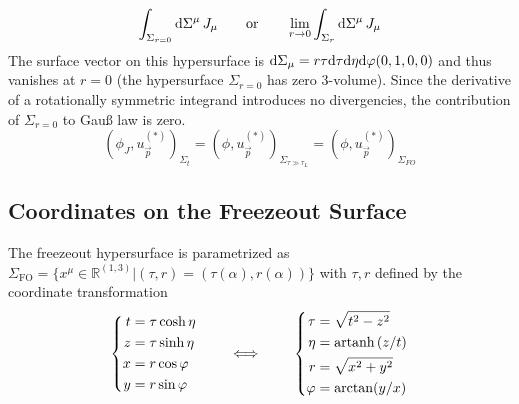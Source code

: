 \begin{equation*}
    \int_{\Sigma_{r=0}}\text{d}\Sigma^\mu\,J_\mu\qquad\text{or}\qquad\lim_{r\to 0}\int_{\Sigma_{r}}\text{d}\Sigma^\mu\,J_\mu
\end{equation*}
The surface vector on this hypersurface is $\text{d}\Sigma_\mu=r\tau\text{d}\tau\text{d}\eta\text{d}\varphi(0,1,0,0)$ and thus vanishes at $r=0$ (the hypersurface $\Sigma_{r=0}$ has zero $3$-volume). Since the derivative of a rotationally symmetric integrand introduces no divergencies, the contribution of $\Sigma_{r=0}$ to Gauß law is zero.
\begin{equation}
    (\phi_J,u_{\vec{p}}^{(*)})_{\Sigma_t}=(\phi,u_{\vec{p}}^{(*)})_{\Sigma_{\tau\gg\tau_L}}=(\phi,u_{\vec{p}}^{(*)})_{\Sigma_{FO}}
\end{equation}

\subsection{Coordinates on the Freezeout Surface}

The freezeout hypersurface is parametrized as $\Sigma_{\text{FO}}=\{x^\mu\in\mathbb{R}^{(1,3)}\vert (\tau,r)=(\tau(\alpha),r(\alpha))\}$ with $\tau,r$ defined by the coordinate transformation
\begin{equation}
    \left\{\begin{split}
        t&=\tau\cosh\eta\\
        z&=\tau\sinh\eta\\
        x&=r\cos\varphi\\
        y&=r\sin\varphi
    \end{split}\right.
    \qquad\iff\qquad
    \left\{\begin{split}
        \tau&=\sqrt{t^2-z^2}\\
        \eta&={\text{artanh}\,}(z/t)\\
        r&=\sqrt{x^2+y^2}\\
        \varphi&=\arctan(y/x)
    \end{split}\right.
\end{equation}

